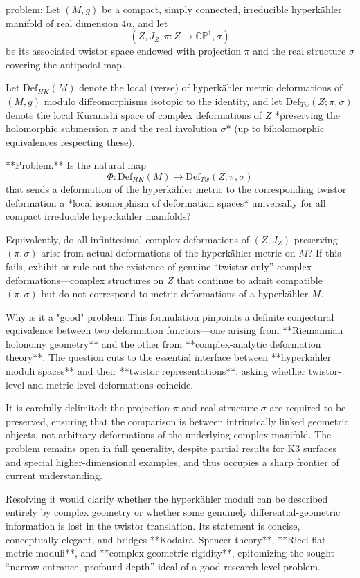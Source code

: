 problem:  
Let \( (M,g) \) be a compact, simply connected, irreducible hyperkähler manifold of real dimension \(4n\), and let   
\[
(Z, J_Z, \pi: Z \to \mathbb{CP}^1, \sigma)
\]
be its associated twistor space endowed with projection \(\pi\) and the real structure \(\sigma\) covering the antipodal map.  

Let \(\mathrm{Def}_{HK}(M)\) denote the local (verse) of hyperkähler metric deformations of \((M,g)\) modulo diffeomorphisms isotopic to the identity, and let \(\mathrm{Def}_{Tw}(Z;\pi,\sigma)\) denote the local Kuranishi space of complex deformations of \(Z\) *preserving the holomorphic submersion \(\pi\) and the real involution \(\sigma\)* (up to biholomorphic equivalences respecting these).  

**Problem.**  
Is the natural map  
\[
\Phi:\mathrm{Def}_{HK}(M)\longrightarrow \mathrm{Def}_{Tw}(Z;\pi,\sigma)
\]
that sends a deformation of the hyperkähler metric to the corresponding twistor deformation a *local isomorphism of deformation spaces* universally for all compact irreducible hyperkähler manifolds?  

Equivalently, do all infinitesimal complex deformations of \((Z,J_Z)\) preserving \((\pi,\sigma)\) arise from actual deformations of the hyperkähler metric on \(M\)?  
If this fails, exhibit or rule out the existence of genuine “twistor-only” complex deformations—complex structures on \(Z\) that continue to admit compatible \((\pi,\sigma)\) but do not correspond to metric deformations of a hyperkähler \(M\).  

Why is it a "good" problem:  
This formulation pinpoints a definite conjectural equivalence between two deformation functors—one arising from **Riemannian holonomy geometry** and the other from **complex-analytic deformation theory**. The question cuts to the essential interface between **hyperkähler moduli spaces** and their **twistor representations**, asking whether twistor-level and metric-level deformations coincide.  

It is carefully delimited: the projection \( \pi \) and real structure \( \sigma \) are required to be preserved, ensuring that the comparison is between intrinsically linked geometric objects, not arbitrary deformations of the underlying complex manifold. The problem remains open in full generality, despite partial results for K3 surfaces and special higher-dimensional examples, and thus occupies a sharp frontier of current understanding.  

Resolving it would clarify whether the hyperkähler moduli can be described entirely by complex geometry or whether some genuinely differential-geometric information is lost in the twistor translation. Its statement is concise, conceptually elegant, and bridges **Kodaira–Spencer theory**, **Ricci-flat metric moduli**, and **complex geometric rigidity**, epitomizing the sought “narrow entrance, profound depth” ideal of a good research-level problem.